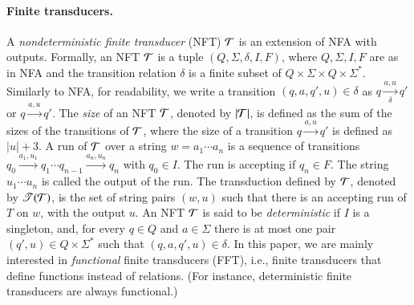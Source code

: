  



\paragraph*{Finite transducers.} A \emph{nondeterministic finite transducer} (NFT) $\mathcal{T}$ is an extension of NFA with outputs. Formally, an NFT $\mathcal{T}$ is a tuple $(Q, \Sigma, \delta, I, F)$, where $Q, \Sigma, I, F$ are as in NFA and the transition relation $\delta$ is a finite subset of $Q \times \Sigma \times Q \times \Sigma^*$. Similarly to NFA, for readability, we write a transition $(q, a, q', u) \in \delta$ as $q \xrightarrow[\delta]{a, u} q'$ or $q \xrightarrow{a, u} q'$. The \emph{size} of an NFT $\mathcal{T}$, denoted by $|\mathcal{T}|$, is defined as the sum of the sizes of the transitions of $\mathcal{T}$, where the size of a transition $q \xrightarrow{a, u} q'$ is defined as $|u|+3$.
%
A run of $\mathcal{T}$ over a string $w=a_1 \cdots a_n$ is a sequence of transitions $q_0 \xrightarrow{a_1, u_1} q_1 \cdots q_{n-1} \xrightarrow{a_n, u_n} q_n$ with $q_0 \in I$. The run is accepting if $q_n \in F$. The string $u_1 \cdots u_n$ is called the output of the run. The transduction defined by $\mathcal{T}$, denoted by $\mathscr{T}(\mathcal{T})$, is the set of string pairs $(w, u)$ such that there is an accepting run of $T$ on $w$, with the output $u$. An NFT $\mathcal{T}$ is said to be \emph{deterministic} if $I$ is a singleton, and, for every $q \in Q$ and $a \in \Sigma$  there is at most one pair $(q', u) \in Q \times \Sigma^*$ such that $(q, a, q', u) \in \delta$.
%
In this paper, we are mainly interested in \emph{functional} finite transducers (FFT), i.e., finite transducers that define functions instead of relations.
(For instance, deterministic finite transducers are always functional.)


